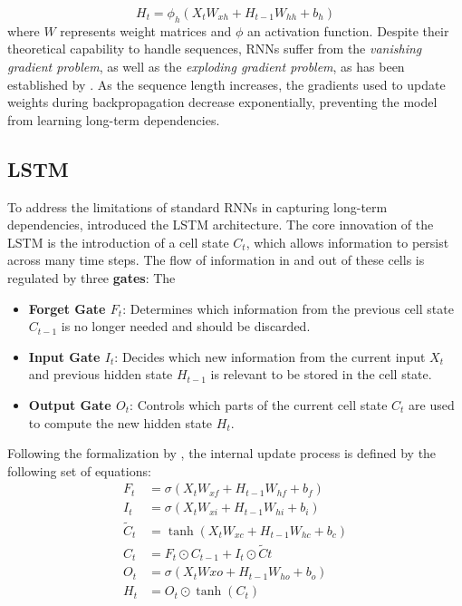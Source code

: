     \begin{equation}
        H_t = \phi_h (X_t W_{xh} + H_{t-1} W_{hh} + b_h) %
    \end{equation}
    where $W$ represents weight matrices and $\phi$ an activation function. Despite their theoretical capability to handle sequences, \acp{RNN} suffer from the \textit{vanishing gradient problem}, as well as the \textit{exploding gradient problem}, as has been established by \cite{279181bengio}. As the sequence length increases, the gradients used to update weights during backpropagation decrease exponentially, preventing the model from learning long-term dependencies.
    
    \subsection{LSTM}
     To address the limitations of standard \acp{RNN} in capturing long-term dependencies, \cite{hochreiterLSTM} introduced the \ac{LSTM} architecture. The core innovation of the \ac{LSTM} is the introduction of a cell state $C_t$, which allows information to persist across many time steps. The flow of information in and out of these cells is regulated by three \textbf{gates}: The
    \begin{itemize}
        \item \textbf{Forget Gate $F_t$}:  Determines which information from the previous cell state $C_{t-1}$ is no longer needed and should be discarded.
        \item \textbf{Input Gate $I_t$}: Decides which new information from the current input $X_t$ and previous hidden state $H_{t-1}$ is relevant to be stored in the cell state.
        \item \textbf{Output Gate $O_t$}: Controls which parts of the current cell state $C_t$ are used to compute the new hidden state $H_t$.
    \end{itemize}
    
     Following the formalization by \cite{gentleschmidt2019recurrentneuralnetworksrnns}, the internal update process is defined by the following set of equations:
     \begin{align}
         F_t &= \sigma(X_t W_{xf} + H_{t-1} W_{hf} + b_f) \\%
         I_t &= \sigma(X_t W_{xi} + H_{t-1} W_{hi} + b_i) \\%
         \tilde{C}_t &= \tanh(X_t W_{xc} + H_{t-1} W_{hc} + b_c) \\%
         C_t &= F_t \odot C_{t-1} + I_t \odot \tilde{C}t \\ %
         O_t &= \sigma(X_t W{xo} + H_{t-1} W_{ho} + b_o) \\ %
         H_t &= O_t \odot \tanh(C_t)
     \end{align}
     
